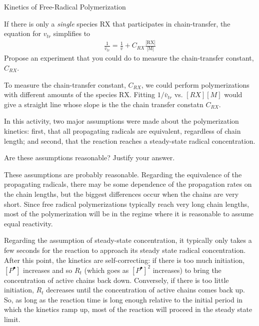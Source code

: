 \begin{activity}{Kinetics of Free-Radical Polymerization}
\begin{ctqs}
	\question If there is only a \emph{single} species RX that participates in chain-transfer, the equation for $v_{tr}$ simplifies to
	\begin{align*}
		\frac{1}{\bar v_{tr}} = \frac{1}{\bar v} + C_{RX}\frac{\text{[RX]}}{\text{[M]}}
	\end{align*}
		Propose an experiment that you could do to measure the chain-transfer constant, $C_{RX}$.
		
		\begin{solution}[2.5in]{}
			To measure the chain-transfer constant, $C_{RX}$, we could perform polymerizations with different amounts of the species RX.  Fitting $1/\bar v_{tr}$ vs. $[RX][M]$ would give a straight line whose slope is the the chain transfer constatn $C_{RX}$.
		\end{solution}
	
\end{ctqs}


\begin{exercises}
		
	\exercise In this activity, two major assumptions were made about the polymerization kinetics: first, that all propagating radicals are equivalent, regardless of chain length; and second, that the reaction reaches a steady-state radical concentration.
	
		Are these assumptions reasonable?  Justify your answer.
			
				\begin{solution}{}
					These assumptions are probably reasonable.  Regarding the equivalence of the propagating radicals, there may be some dependence of the propagation rates on the chain lengths, but the biggest differences occur when the chains are very short. Since free radical polymerizations typically reach very long chain lengths, most of the polymerization will be in the regime where it is reasonable to assume equal reactivity.
					
					Regarding the assumption of steady-state concentration, it typically only takes a few seconds for the reaction to approach its steady state radical concentration.  After this point, the kinetics are self-correcting: if there is too much initiation, $[P^\bullet]$ increases and so $R_t$ (which goes as $[P^\bullet]^2$ increases) to bring the concentration of active chains back down.  Conversely, if there is too little initiation, $R_t$ decreases until the concentration of active chains comes back up.  So, as long as the reaction time is long enough relative to the initial period in which the kinetics ramp up, most of the reaction will proceed in the steady state limit.  
				\end{solution}
		

\end{exercises}
\end{activity}
